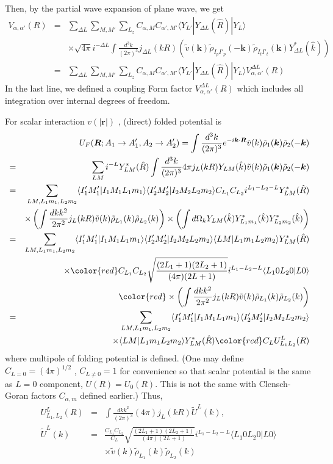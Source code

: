 \documentclass[11pt]{book}
\def\bm{\boldsymbol}
\def\vk{{\bm k}}
\def\vr{{\bm r}}
\def\vR{{\bm R}}
\def\la{\langle}
\def\ra{\rangle}
\newcommand{\bea}{\begin{eqnarray}}
\newcommand{\eea}{\end{eqnarray}}
\newcommand{\no}{\nonumber \\}
\begin{document}
Then, by the partial wave expansion of plane wave, we get 
\bea 
V_{\alpha,\alpha'}(R)&=& \sum_{\Delta L} \sum_{M,M'}\sum_{L_z}
C_{\alpha,M}C_{\alpha',M'}\la Y_{L'}|  Y_{\Delta L}(\hat{R}) |Y_L\ra
\no & &\times \sqrt{4\pi} i^{-\Delta L}
\int \frac{d^3 k}{(2\pi)^3} j_{\Delta L}(k R)\left( \tilde{v}(\vk) \tilde{\rho}_{I_p I'_p}(-\vk)\tilde{\rho}_{I_t I'_t}(\vk) Y_{\Delta L}^*(\hat{k}) \right) \no 
&=& \sum_{\Delta L} \sum_{M,M'}\sum_{L_z} 
C_{\alpha,M}C_{\alpha',M'}\la Y_{L'}|  Y_{\Delta L}(\hat{R}) |Y_L\ra V_{\alpha,\alpha'}^{\Delta L}(R) 
\eea 
In the last line, we defined a coupling Form factor  $V_{\alpha,\alpha'}^{\Delta L}(R)$
which includes all integration over internal degrees of freedom. 

For scalar interaction $v(|\vr|)$ , 
(direct) folded potential is
\bea 
& & U_F(\vR;A_1\to A'_1,A_2\to A'_2)=\int \frac{d^3 k}{(2\pi)^3} e^{-i\vk\cdot\vR} \tilde{v}(k)\tilde{\rho}_1(\vk)\tilde{\rho}_2(-\vk) \no 
&=&\sum_{LM} i^{-L} Y^*_{LM}(\hat{R})\int \frac{d^3 k}{(2\pi)^3} 4\pi j_L(kR) 
  Y_{LM}(\hat{k}) \tilde{v}(k) \tilde{\rho}_{1}(\vk)\tilde{\rho}_{2}(-\vk) \no 
&=&\sum_{L M,L_1 m_1,L_2 m_2} \la I'_1 M'_1| I_1 M_1 L_1 m_1\ra   \la I'_2 M'_2| I_2 M_2 L_2 m_2\ra
    C_{L_1} C_{L_2} i^{L_1-L_2-L} Y^*_{LM}(\hat{R}) \no 
    & &\times \left( 
    \int \frac{dk k^2 }{2\pi^2} j_L(kR)\tilde{v}(k) \tilde{\rho}_{L_1}(k)\tilde{\rho}_{L_2}(k) \right) \times 
    \left( \int d\Omega_k Y_{LM}(\hat{k})Y^*_{L_1m_1}(\hat{k})Y^*_{L_2 m_2}(\hat{k}) \right) \no 
&=& \sum_{L M,L_1 m_1,L_2 m_2} \la I'_1 M'_1| I_1 M_1 L_1 m_1\ra   \la I'_2 M'_2| I_2 M_2 L_2 m_2\ra
     \la L M| L_1 m_1 L_2 m_2\ra  Y^*_{LM}(\hat{R})\no 
    & &\times  {\color{red} C_{L_1}C_{L_2}\sqrt{\frac{(2L_1+1)(2L_2+1)}{(4\pi)(2L+1)}} i^{L_1-L_2-L}
    	      \la L_1 0 L_2 0| L 0\ra  }
    	      \no & &{\color{red} \times 
    	      \left( 
    	      \int \frac{dk k^2 }{2\pi^2} j_L(kR)\tilde{v}(k) \tilde{\rho}_{L_1}(k)\tilde{\rho}_{L_2}(k) \right) }\no 
&=& \sum_{L M,L_1 m_1,L_2 m_2} \la I'_1 M'_1| I_1 M_1 L_1 m_1\ra   \la I'_2 M'_2| I_2 M_2 L_2 m_2\ra
  \no & &\times 
\la L M| L_1 m_1 L_2 m_2\ra  Y^*_{LM}(\hat{R}) {\color{red} C_L U_{L_1L_2}^L(R) }   	      
\eea 
where multipole of folding potential is defined. 
(One may define $C_{L=0}=(4\pi)^{1/2}$ , $C_{L\neq 0}=1$ for convenience
so that scalar potential is the same as $L=0$ component, $U(R)=U_0(R)$.
This is not the same with Clensch-Goran factors $C_{\alpha,m}$ defined earlier.)
Thus,
\bea 
U^{L}_{L_1,L_2}(R) &=&\int \frac{dk k^2 }{(2\pi)^3}(4\pi) j_L(kR) \tilde{U}^{L}(k),\no 
\tilde{U}^{L}(k)&=&   
    \frac{ C_{L_1}C_{L_2}}{C_L} \sqrt{\frac{(2L_1+1)(2L_2+1)}{(4\pi)(2L+1)}} i^{L_1-L_2-L}
	\la L_1 0 L_2 0| L 0\ra  \no & &\times 
	\tilde{v}(k) \tilde{\rho}_{L_1}(k)\tilde{\rho}_{L_2}(k)
\eea 
\end{document}
